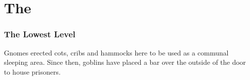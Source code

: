\chapter{The }
\epigraph{
  \iftoggle{hardcore}{%
    The more I take the more I leave behind.
    What am I?
  }{%
    There is something I seek.

    While it is bound, it chooses kings and peasants.
    When it is freed, it foretells war or woe.

    While it bound, it propels men's lusts and furies.
    When it is freed, it tumbles, falls, and fades.

    While it is bound, life will often thrive.
    When it is freed, death will often follow.
  }%
}{}

\begin{multicols}{2}

\subsection{The Lowest Level}



\begin{exampletext}

  Gnomes erected cots, cribs and hammocks here to be used as a communal sleeping area.
  Since then, goblins have placed a bar over the outside of the door to house prisoners.


\end{exampletext}
\end{multicols}
